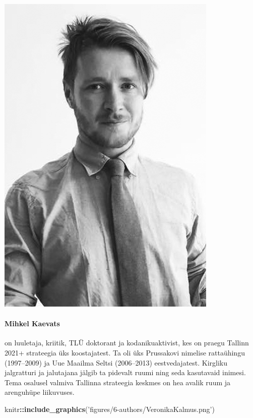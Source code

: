 \documentclass[estonian,]{article}
\newenvironment{Shaded}{\begin{snugshade}}{\end{snugshade}}
\newcommand{\KeywordTok}[1]{\textcolor[rgb]{0.13,0.29,0.53}{\textbf{#1}}}
\newcommand{\NormalTok}[1]{#1}
\newcommand{\OperatorTok}[1]{\textcolor[rgb]{0.81,0.36,0.00}{\textbf{#1}}}
\newcommand{\StringTok}[1]{\textcolor[rgb]{0.31,0.60,0.02}{#1}}
\let\oldparagraph\paragraph
\renewcommand{\paragraph}[1]{\oldparagraph{#1}\mbox{}}
\begin{document}
\begin{flushleft}\includegraphics[width=0.5\linewidth]{figures/6-authors/MihkelKaevats} \end{flushleft}

\hypertarget{mihkel-kaevats}{%
\paragraph{Mihkel Kaevats}\label{mihkel-kaevats}}

on luuletaja, kriitik, TLÜ doktorant ja kodanikuaktivist, kes on praegu Tallinn 2021+ strateegia üks koostajatest. Ta oli üks Prussakovi nimelise rattaühingu (1997--2009) ja Uue Maailma Seltsi (2006--2013) eestvedajatest. Kirgliku jalgratturi ja jalutajana jälgib ta pidevalt ruumi ning seda kasutavaid inimesi. Tema osalusel valmiva Tallinna strateegia keskmes on hea avalik ruum ja arenguhüpe liikuvuses.

\begin{Shaded}
\begin{Highlighting}[]
\NormalTok{knitr}\OperatorTok{::}\KeywordTok{include_graphics}\NormalTok{(}\StringTok{'figures/6-authors/VeronikaKalmus.png'}\NormalTok{)}
\end{Highlighting}
\end{Shaded}
\end{document}
